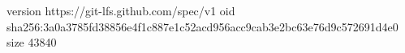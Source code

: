 version https://git-lfs.github.com/spec/v1
oid sha256:3a0a3785fd38856e4f1c887e1c52acd956acc9cab3e2bc63e76d9c572691d4e0
size 43840
